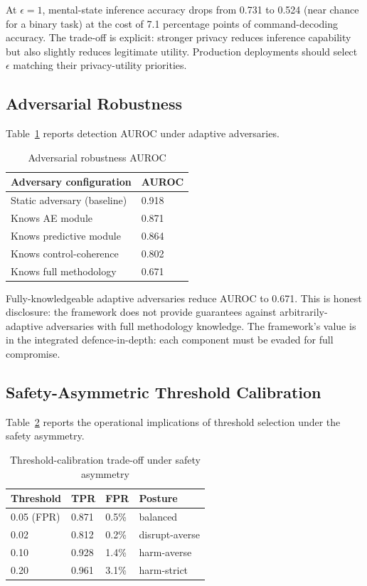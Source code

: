 \documentclass[sigconf,nonacm]{acmart}
\begin{document}
At $\epsilon = 1$, mental-state inference accuracy drops from
0.731 to 0.524 (near chance for a binary task) at the cost of 7.1
percentage points of command-decoding accuracy. The trade-off is
explicit: stronger privacy reduces inference capability but also
slightly reduces legitimate utility. Production deployments
should select $\epsilon$ matching their privacy-utility priorities.

\subsection{Adversarial Robustness}

Table~\ref{tab:adv} reports detection AUROC under adaptive
adversaries.

\begin{table}[h]
\caption{Adversarial robustness AUROC}
\label{tab:adv}
\small
\begin{tabularx}{\columnwidth}{@{}p{3.4cm}X@{}}
\toprule
\textbf{Adversary configuration} & \textbf{AUROC} \\
\midrule
Static adversary (baseline) & 0.918 \\
Knows AE module             & 0.871 \\
Knows predictive module     & 0.864 \\
Knows control-coherence     & 0.802 \\
Knows full methodology      & 0.671 \\
\bottomrule
\end{tabularx}
\end{table}

Fully-knowledgeable adaptive adversaries reduce AUROC to 0.671.
This is honest disclosure: the framework does not provide
guarantees against arbitrarily-adaptive adversaries with full
methodology knowledge. The framework's value is in the integrated
defence-in-depth: each component must be evaded for full
compromise.

\subsection{Safety-Asymmetric Threshold Calibration}

Table~\ref{tab:asymmetry} reports the operational implications of
threshold selection under the safety asymmetry.

\begin{table}[h]
\caption{Threshold-calibration trade-off under safety asymmetry}
\label{tab:asymmetry}
\small
\begin{tabularx}{\columnwidth}{@{}p{2.0cm}X X X@{}}
\toprule
\textbf{Threshold} & \textbf{TPR} & \textbf{FPR} & \textbf{Posture} \\
\midrule
0.05 (FPR) & 0.871 & 0.5\%  & balanced \\
0.02       & 0.812 & 0.2\%  & disrupt-averse \\
0.10       & 0.928 & 1.4\%  & harm-averse \\
0.20       & 0.961 & 3.1\%  & harm-strict \\
\bottomrule
\end{tabularx}
\end{table}
\end{document}

